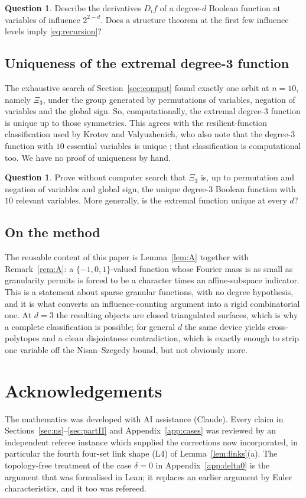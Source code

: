 \documentclass[11pt,reqno]{amsart}
\theoremstyle{plain}
\theoremstyle{definition}
\newtheorem{question}[theorem]{Question}
\numberwithin{theorem}{section}
\newcommand{\bits}{\{-1,0,1\}}
\newcommand{\XiC}{\Xi}
\begin{document}
\begin{question}
Describe the derivatives $D_i f$ of a degree-$d$ Boolean function at variables of influence
$2^{2-d}$. Does a structure theorem at the first few influence levels imply
\eqref{eq:recursion}?
\end{question}

\subsection{Uniqueness of the extremal degree-3 function}
The exhaustive search of Section~\ref{sec:comput} found exactly one orbit at $n = 10$, namely
$\XiC_3$, under the group generated by permutations of variables, negation of variables and the
global sign. So, computationally, the extremal degree-$3$ function is unique up to those
symmetries. This agrees with the resilient-function classification used by Krotov and
Valyuzhenich, who also note that the degree-$3$ function with $10$ essential variables is unique
\cite{KV24}; that classification is computational too. We have no proof of uniqueness by hand.

\begin{question}
Prove without computer search that $\XiC_3$ is, up to permutation and negation of variables and
global sign, the unique degree-$3$ Boolean function with $10$ relevant variables. More
generally, is the extremal function unique at every $d$?
\end{question}

\subsection{On the method}
The reusable content of this paper is Lemma~\ref{lem:A} together with Remark~\ref{rem:A}: a
$\bits$-valued function whose Fourier mass is as small as granularity permits is forced to be a
character times an affine-subspace indicator. This is a statement about sparse granular
functions, with no degree hypothesis, and it is what converts an influence-counting argument
into a rigid combinatorial one. At $d = 3$ the resulting objects are closed triangulated
surfaces, which is why a complete classification is possible; for general $d$ the same device
yields cross-polytopes and a clean disjointness contradiction, which is exactly enough to strip
one variable off the Nisan--Szegedy bound, but not obviously more.

\section*{Acknowledgements}
The mathematics was developed with AI assistance (Claude). Every claim in
Sections~\ref{sec:ns}--\ref{sec:partII} and Appendix~\ref{app:cases} was reviewed by an
independent referee instance which supplied the corrections now incorporated, in particular the
fourth four-set link shape (L4) of Lemma~\ref{lem:links}(a). The topology-free treatment of the
case $\delta = 0$ in Appendix~\ref{app:delta0} is the argument that was formalised in Lean; it
replaces an earlier argument by Euler characteristics, and it too was refereed.
\end{document}
